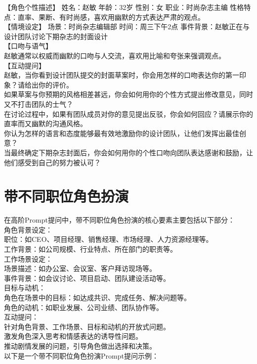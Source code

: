 \documentclass[12pt]{book}
\begin{document}
【角色个性描述】 姓名：赵敏 年龄：32岁 性别：女 职业：时尚杂志主编 性格特点：直率、果断、有时尚感，喜欢用幽默的方式表达严肃的观点。\\

【情境设定】 场景：时尚杂志编辑部 时间：周三下午2点 事件背景：赵敏正在与设计团队讨论下期杂志的封面设计\\

【口吻与语气】\\

赵敏通常以权威而幽默的口吻与人交流，喜欢用比喻和夸张来强调观点。\\
【互动提问】\\

赵敏，当你看到设计团队提交的封面草案时，你会用怎样的口吻表达你的第一印象？请给出你的评价。\\
如果草案与你预期的风格相差甚远，你会如何用你的个性方式提出修改意见，同时又不打击团队的士气？\\
在讨论过程中，如果有团队成员对你的意见提出反驳，你会如何回应？请展示你的直率而又幽默的沟通风格。\\
你认为怎样的语言和态度能够最有效地激励你的设计团队，让他们发挥出最佳创意？\\
当最终确定下期杂志封面后，你会如何用你的个性口吻向团队表达感谢和鼓励，让他们感受到自己的努力被认可？\\

\section{带不同职位角色扮演}
在高阶Prompt提问中，带不同职位角色扮演的核心要素主要包括以下部分：\\

角色背景设定：\\
职位：如CEO、项目经理、销售经理、市场经理、人力资源经理等。\\
工作背景：如公司规模、行业特点、所在部门的职责等。\\
工作场景设定：\\
场景描述：如办公室、会议室、客户拜访现场等。\\
事件背景：如会议讨论、项目启动、团队建设活动等。\\
目标与动机：\\
角色在场景中的目标：如达成共识、完成任务、解决问题等。\\
角色的动机：如职业发展、公司业绩、团队协作等。\\
互动提问：\\
针对角色背景、工作场景、目标和动机的开放式问题。\\
激发角色深入思考和情感表达的诱导性问题。\\
推动剧情发展的问题，引导角色做出选择和决策。\\
以下是一个带不同职位角色扮演Prompt提问示例：\\
\end{document}

